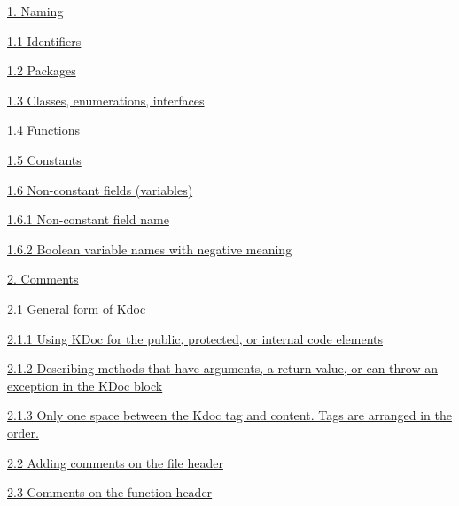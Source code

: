 \hspace{0.0cm}\hyperref[sec:1.]{1. Naming}

\hspace{0.0cm}\hyperref[sec:]{}

\hspace{0.5cm}\hyperref[sec:1.1]{ 1.1 Identifiers}

\hspace{0.5cm}\hyperref[sec:1.2]{ 1.2 Packages}

\hspace{0.5cm}\hyperref[sec:1.3]{ 1.3 Classes, enumerations, interfaces}

\hspace{0.5cm}\hyperref[sec:1.4]{ 1.4 Functions}

\hspace{0.5cm}\hyperref[sec:1.5]{ 1.5 Constants}

\hspace{0.5cm}\hyperref[sec:1.6]{ 1.6 Non-constant fields (variables)}

\hspace{1.0cm}\hyperref[sec:1.6.1]{ 1.6.1 Non-constant field name}

\hspace{1.0cm}\hyperref[sec:1.6.2]{ 1.6.2 Boolean variable names with negative meaning}

\hspace{0.0cm}\hyperref[sec:]{}

\hspace{0.0cm}\hyperref[sec:2.]{2. Comments}

\hspace{0.5cm}\hyperref[sec:2.1]{ 2.1 General form of Kdoc}

\hspace{1.0cm}\hyperref[sec:2.1.1]{ 2.1.1 Using KDoc for the public, protected, or internal code elements}

\hspace{1.0cm}\hyperref[sec:2.1.2]{ 2.1.2 Describing methods that have arguments, a return value, or can throw an exception in the KDoc block}

\hspace{1.0cm}\hyperref[sec:2.1.3]{ 2.1.3 Only one space between the Kdoc tag and content. Tags are arranged in the order.}

\hspace{0.5cm}\hyperref[sec:2.2]{ 2.2 Adding comments on the file header}

\hspace{0.5cm}\hyperref[sec:2.3]{ 2.3 Comments on the function header}

